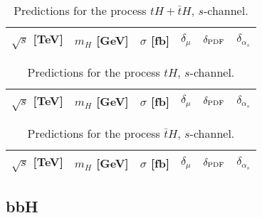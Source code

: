\begin{table}
    \centering
    \begin{tabular}{cccccc}
        $\sqrt{s}$ [TeV]  &  $m_H$ [GeV]  &  $\sigma$ [fb]  & $\delta_{\mu}$   &  $\delta_{\rm PDF}$   & $\delta_{\alpha_s}$\\
        \hline
          
    \end{tabular}
    \caption{\label{tab:th-s-tot} Predictions for the process $tH + \bar t H$, $s$-channel.}
\end{table}
%
\begin{table}
    \centering
    \begin{tabular}{cccccc}
        $\sqrt{s}$ [TeV]  &  $m_H$ [GeV]  &  $\sigma$ [fb]  & $\delta_{\mu}$   &  $\delta_{\rm PDF}$   & $\delta_{\alpha_s}$\\
        \hline
          
    \end{tabular}
    \caption{\label{tab:th-s-top} Predictions for the process $tH$, $s$-channel.}
\end{table}
%
\begin{table}
    \centering
    \begin{tabular}{cccccc}
        $\sqrt{s}$ [TeV]  &  $m_H$ [GeV]  &  $\sigma$ [fb]  & $\delta_{\mu}$   &  $\delta_{\rm PDF}$   & $\delta_{\alpha_s}$\\
        \hline
          
    \end{tabular}
    \caption{\label{tab:th-s-atop} Predictions for the process $\bar tH$, $s$-channel.}
\end{table}
\subsection{bbH}

